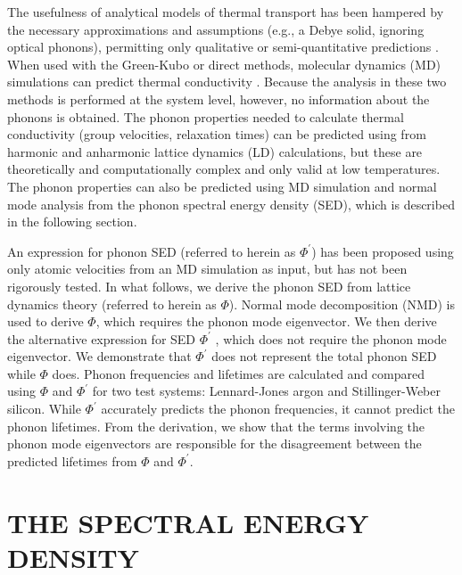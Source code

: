 \documentclass[twocolumn,10pt]{asme2e}
\begin{document}
The usefulness of analytical models of thermal transport has been hampered by
the necessary approximations and assumptions (e.g., a Debye solid, ignoring
optical phonons), permitting only qualitative or semi-quantitative
predictions \cite{callaway1959,holland1963}. When used with the Green-Kubo or
direct methods, molecular dynamics (MD) simulations can predict thermal
conductivity \cite{mcgaughey2004c,landry2008,schelling2002,sellan2010a}.
Because the analysis in these two methods is performed at the system level,
however, no information about the phonons is obtained. The phonon properties
needed to calculate thermal conductivity (group velocities, relaxation times)
can be predicted using from harmonic and anharmonic lattice dynamics (LD)
calculations,\cite{maradudin1962,wallace1972,ladd1986,dove1993,turney2009a}
but these are theoretically and computationally complex and only valid at low
temperatures. The phonon properties can also be predicted using MD simulation and normal mode analysis
\cite{ladd1986,mcgaughey2004c,henry2008,goicochea2010} from the phonon spectral energy density (SED), which is described in the following section.

An expression for phonon SED\cite{marayuma2003,shiomi2006,dekoker2009,thomas2010c} (referred to herein as $\Phi^{'}$) has been proposed using only atomic velocities from an MD simulation as input, but has not been rigorously tested. In what follows, we derive the phonon SED from lattice dynamics
theory (referred to herein as $\Phi$). Normal mode decomposition (NMD)\cite{dove1993} is used to derive $\Phi$, which requires the phonon mode eigenvector. We then derive the alternative expression for SED $\Phi^{'}$ \cite{thomas2010c}, which does not require the phonon mode eigenvector. We demonstrate that $\Phi^{'}$ does not represent the total phonon SED while $\Phi$ does. Phonon frequencies and lifetimes are calculated and compared using $\Phi$ and $\Phi^{'}$ for two test systems: Lennard-Jones argon and Stillinger-Weber silicon. While $\Phi^{'}$ accurately predicts the phonon frequencies, it cannot predict the phonon lifetimes.  From the derivation, we show that the terms involving the phonon mode eigenvectors are responsible for the disagreement between the predicted lifetimes from $\Phi$ and $\Phi^{'}$.

\section*{THE SPECTRAL ENERGY DENSITY}\label{S:SED}
\end{document}

